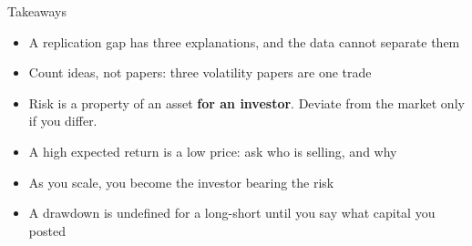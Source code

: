\documentclass[aspectratio=169,10pt]{beamer}
\begin{document}
\begin{frame}{Takeaways}
\begin{itemize}
\item A replication gap has three explanations, and the data cannot separate them
\vskip 7pt
\item Count ideas, not papers: three volatility papers are one trade
\vskip 7pt
\item Risk is a property of an asset \textbf{for an investor}. Deviate from the market only if you differ.
\vskip 7pt
\item A high expected return is a low price: ask who is selling, and why
\vskip 7pt
\item As you scale, you become the investor bearing the risk
\vskip 7pt
\item A drawdown is undefined for a long-short until you say what capital you posted
\end{itemize}
\end{frame}
\end{document}
